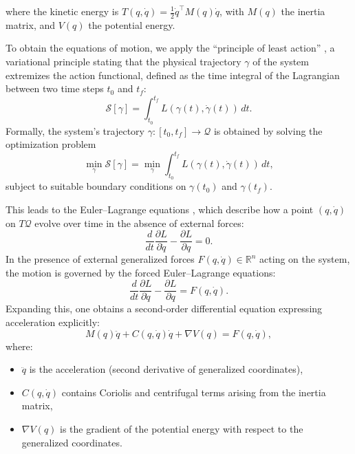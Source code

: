 \documentclass{article}
\theoremstyle{plain}
\theoremstyle{definition}
\theoremstyle{remark}
\begin{document}
where the kinetic energy is $T(q, \dot{q}) = \frac{1}{2} \dot{q}^\top M(q) \dot{q}$, with $M(q)$ the inertia matrix, and $V(q)$ the potential energy.

To obtain the equations of motion, we apply the ``principle of least action'' \cite{Lanczos1970}, a variational principle stating that the physical trajectory $\gamma$ of the system extremizes the action functional, defined as the time integral of the Lagrangian between two time steps $t_0$ and $t_f$:
\[
\mathcal{S}[\gamma] = \int_{t_0}^{t_f} L(\gamma(t), \dot{\gamma}(t)) \, dt.
\]
Formally, the system's trajectory $\gamma : [t_0, t_f] \to \mathcal{Q}$ is obtained by solving the optimization problem
\[
\min_{\gamma} \mathcal{S}[\gamma] = \min_{\gamma} \int_{t_0}^{t_f} L(\gamma(t), \dot{\gamma}(t)) \, dt,
\]
subject to suitable boundary conditions on $\gamma(t_0)$ and $\gamma(t_f)$.

This leads to the Euler--Lagrange equations \cite{goldstein:mechanics}, which describe how a point $(q, \dot{q})$ on $T\mathcal{Q}$ evolve over time in the absence of external forces:
\[
\frac{d}{dt} \frac{\partial L}{\partial \dot{q}} - \frac{\partial L}{\partial q} = 0.
\]
In the presence of external generalized forces $F(q, \dot{q}) \in \mathbb{R}^n$ acting on the system, the motion is governed by the forced Euler--Lagrange equations:
\[
\frac{d}{dt} \frac{\partial L}{\partial \dot{q}} - \frac{\partial L}{\partial q} = F(q, \dot{q}).
\]
Expanding this, one obtains a second-order differential equation expressing acceleration explicitly:
\[
M(q) \ddot{q} + C(q, \dot{q}) \dot{q} + \nabla V(q) = F(q, \dot{q}),
\]
where:
\begin{itemize}
    \item $\ddot{q}$ is the acceleration (second derivative of generalized coordinates),
    \item $C(q, \dot{q})$ contains Coriolis and centrifugal terms arising from the inertia matrix,
    \item $\nabla V(q)$ is the gradient of the potential energy with respect to the generalized coordinates.
\end{itemize}
\end{document}
